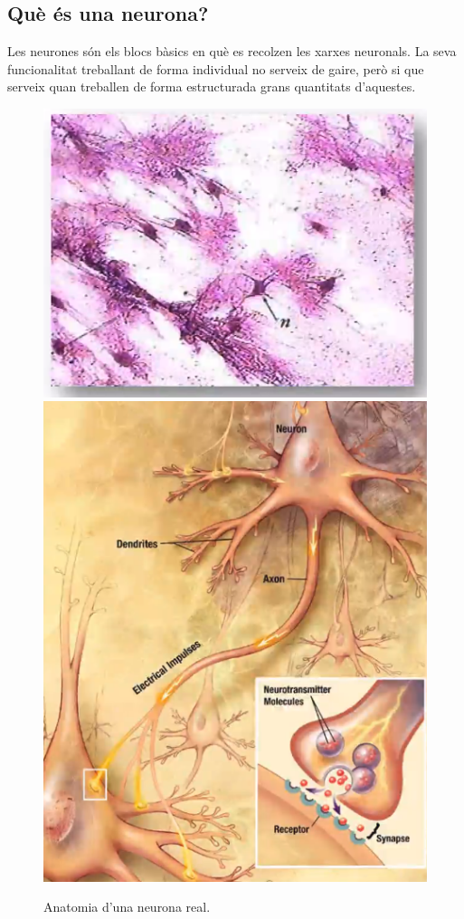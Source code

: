 \documentclass[12pt]{article}
\begin{document}
\subsection{Què és una neurona?}
Les neurones són els blocs bàsics en què es recolzen les xarxes neuronals. La seva funcionalitat treballant de forma individual no serveix de gaire, però si que serveix quan treballen de forma estructurada grans quantitats d'aquestes.
\begin{figure}[h!]
	\centering
	\includegraphics[scale=0.4]{imatges/neurona/1real.png}
	\includegraphics[scale=0.4]{imatges/neurona/3estructura.png}
	\caption{Anatomia d'una neurona real.}
\end{figure}
\end{document}
